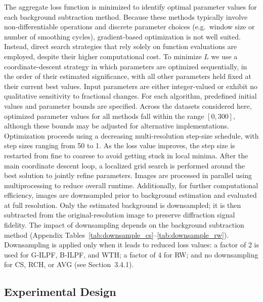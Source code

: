 \documentclass[iucr]{iucrjournals}
\begin{document}
The aggregate loss function is minimized to identify optimal parameter values for each background subtraction method. Because these methods typically involve non-differentiable operations and discrete parameter choices (e.g.\ window size or number of smoothing cycles), gradient-based optimization is not well suited. Instead, direct search strategies that rely solely on function evaluations are employed, despite their higher computational cost. To minimize $L$ we use a coordinate-descent strategy in which parameters are optimized sequentially, in the order of their estimated significance, with all other parameters held fixed at their current best values. Input parameters are either integer-valued or exhibit no qualitative sensitivity to fractional changes. For each algorithm, predefined initial values and parameter bounds are specified. Across the datasets considered here, optimized parameter values for all methods fall within the range $[0, 300]$, although these bounds may be adjusted for alternative implementations. Optimization proceeds using a decreasing multi-resolution step-size schedule, with step sizes ranging from 50 to 1. As the loss value improves, the step size is restarted from fine to coarese to avoid getting stuck in local minima. After the main coordinate descent loop, a localized grid search is performed around the best solution to jointly refine parameters. Images are processed in parallel using multiprocessing to reduce overall runtime. Additionally, for further computational efficiency, images are downsampled prior to background estimation and evaluated at full resolution. Only the estimated background is downsampled; it is then subtracted from the original-resolution image to preserve diffraction signal fidelity. The impact of downsampling depends on the background subtraction method (Appendix Tables~\ref{tab:downsample_cs}--\ref{tab:downsample_rw}). Downsampling is applied only when it leads to reduced loss values: a factor of 2 is used for G-ILPF, B-ILPF, and WTH; a factor of 4 for RW; and no downsampling for CS, RCH, or AVG (see Section~3.4.1).


\subsection{Experimental Design}

\end{document}
